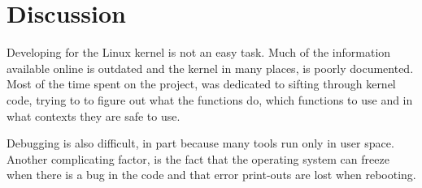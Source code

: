 \documentclass[final,a4paper]{article}
\begin{document}
\section*{Discussion}
Developing for the Linux kernel is not an easy task. Much of the information
available online is outdated and the kernel in many places, is poorly
documented. Most of the time spent on the project, was dedicated to sifting
through kernel code, trying to to figure out what the functions do, which
functions to use and in what contexts they are safe to use.

Debugging is also difficult, in part because many tools run only in user space.
Another complicating factor, is the fact that the operating system can freeze
when there is a bug in the code and that error print-outs are lost when
rebooting.
\end{document}
